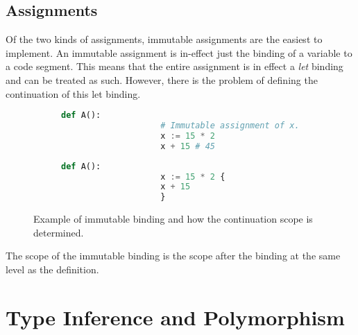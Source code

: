 \documentclass{l4proj}
\begin{document}
\subsection*{Assignments}

Of the two kinds of assignments, immutable assignments are the easiest to implement.
An immutable assignment is in-effect just the binding of a variable to a code segment.
This means that the entire assignment is in effect a \emph{let} binding and can be treated as such.
However, there is the problem of defining the continuation of this let binding.

\begin{figure}[H]
    \begin{subfigure}{0.45\textwidth}
        \begin{center}
            \begin{lstlisting}[language=Python, keepspaces=true]
                def A():
                    # Immutable assignment of x.
                    x := 15 * 2 
                    x + 15 # 45
            \end{lstlisting}
        \end{center}
    \end{subfigure}
    \begin{subfigure}{0.45\textwidth}
        \begin{center}
            \begin{lstlisting}[language=Python, keepspaces=true]
                def A():
                    x := 15 * 2 {
                    x + 15
                    }      
            \end{lstlisting}
        \end{center}
    \end{subfigure}
    \caption{Example of immutable binding and how the continuation scope is determined.}
    \label{fig:immutable-binding-scope}
\end{figure}

The scope of the immutable binding is the scope after the binding at the same level as the definition.

\section{Type Inference and Polymorphism} \label{sec:type-inference-and-polymorphism}
\end{document}
